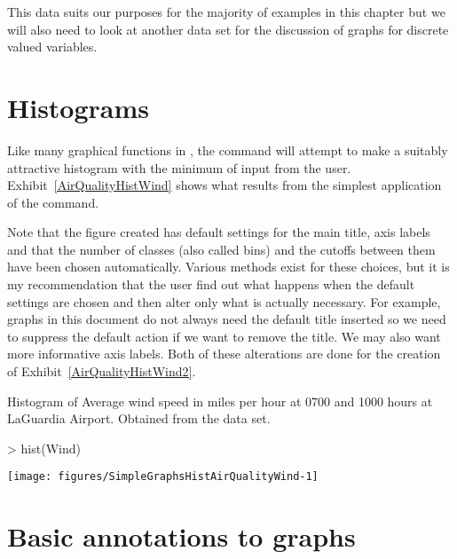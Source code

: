This data suits our purposes for the majority of examples in this chapter but we will also need to look at another data set for the discussion of graphs for discrete valued variables. 
 
\section{Histograms} 
 
Like many graphical functions in \R{}, the  command will attempt to make a suitably attractive histogram with the minimum of input from the user. Exhibit~\ref{AirQualityHistWind} shows what results from the simplest application of the  command. 
 
Note that the figure created has default settings for the main title, axis labels and that the number of classes (also called bins) and the cutoffs between them have been chosen automatically. Various methods exist for these choices, but it is my recommendation that the user find out what happens when the default settings are chosen and then alter only what is actually necessary. For example, graphs in this document do not always need the default title inserted so we need to suppress the default action if we want to remove the title. We may also want more informative axis labels. Both of these alterations are done for the creation of Exhibit~\ref{AirQualityHistWind2}.  
 
\begin{exhibit} 
\begin{center} 
\caption{Histogram of Average wind speed in miles per hour at 0700 and 1000 hours at LaGuardia Airport. Obtained from the  data set.} 
\label{AirQualityHistWind} 
\begin{Schunk}
\begin{Sinput}
> hist(Wind) 
\end{Sinput}

\texttt{[image: figures/SimpleGraphsHistAirQualityWind-1]} \end{Schunk}
\end{center} 
\end{exhibit} 
 
\section{Basic annotations to graphs} 
 
